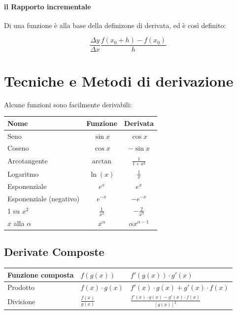 \documentclass[12pt, a4paper, openany]{book}
\begin{document}
\paragraph*{il Rapporto incrementale} Di una funzione è alla base della definizone di derivata, ed è così definito:

\[ 
	\frac{\Delta y}{ \Delta x}\frac{f(x_0+h)-f(x_0)}{h} 
\]




\section{Tecniche e Metodi di derivazione}
Alcune funzioni sono facilmente derivabili:\\
\begin{tabularx}{\textwidth}{|Y|c|c|}
	\hline
	\textbf{Nome}           & \textbf{Funzione} & \textbf{Derivata}     \\
	\hline
	\hline
	Seno                    & $\sin x$          & $\cos x$              \\
	\hline
	Coseno                  & $\cos x$          & $-\sin x$             \\
	\hline
	Arcotangente            & $\arctan$         & $\frac{1}{1+x^2}$     \\
	\hline
	Logaritmo               & $\ln(x) $         & $\frac{1}{x}$         \\
	\hline
	Esponenziale            & $e^x$             & $e^x$                 \\
	\hline
	Esponenziale (negativo) & $e^{-x}$          & $ -e^{-x}$            \\
	 su $x^2$              & $\frac{1}{x^2}$   & $-\frac{2}{x^3}$      \\
	\hline
	$x$ alla $\alpha$       & $x^\alpha$        & $\alpha x^{\alpha-1}$ \\
	\hline
\end{tabularx}

\subsection{Derivate Composte}

\begin{tabularx}{\textwidth}{|l|Y|Y|}
	\hline
	Funzione composta & $f(g(x))$           & $ f'(g(x))\cdot g'(x)$                                \\
	\hline
	Prodotto     & $f(x)\cdot g(x)$    & $f'(x)\cdot g(x) + g'(x)\cdot f(x)$                   \\
	\hline
	Divisione    & $\frac{f(x)}{g(x)}$ & $\frac{f'(x)\cdot g(x) - g'(x) \cdot f(x)}{[g(x)]^2}$ \\
	\hline
\end{tabularx}
\end{document}
